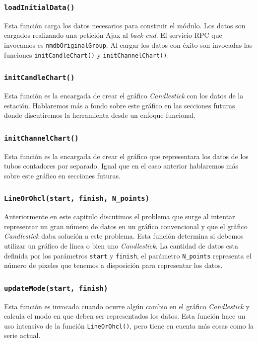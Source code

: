 		\subsubsection{\texttt{loadInitialData()}}
			Esta función carga los datos necesarios para construir el módulo. Los datos son cargados realizando una petición Ajax al
			\emph{back-end}. El servicio RPC que invocamos es \texttt{nmdbOriginalGroup}. Al cargar los datos con éxito son invocadas las
			funciones \texttt{initCandleChart()} y \texttt{initChannelChart()}. 
		\subsubsection{\texttt{initCandleChart()}}
			Esta función es la encargada de crear el gráfico \emph{Candlestick} con los datos de la estación. Hablaremos más a fondo sobre
			este gráfico en las secciones futuras donde discutiremos la herramienta desde un enfoque funcional.
		\subsubsection{\texttt{initChannelChart()}}
			Esta función es la encargada de crear el gráfico que representara los datos de los tubos contadores por separado. Igual que en
			el caso anterior hablaremos más sobre este gráfico en secciones futuras.
		\subsubsection{\texttt{LineOrOhcl(start, finish, N\_points)}}
			Anteriormente en este capitulo discutimos el problema que surge al intentar representar un gran número de datos en un gráfico
			convencional y que el gráfico \emph{Candlestick} daba solución a este problema. Esta función determina si debemos utilizar un
			gráfico de línea o bien uno \emph{Candlestick}. La cantidad de datos esta definida por los parámetros \texttt{start} y
			\texttt{finish}, el parámetro \texttt{N\_points} representa el número de pixeles que tenemos a disposición para representar
			los datos.
		\subsubsection{\texttt{updateMode(start, finish)}}
			Esta función es invocada cuando ocurre algún cambio en el gráfico \emph{Candlestick} y calcula el modo en que deben ser
			representados los datos. Esta función hace un uso intensivo de la función \texttt{LineOrOhcl()}, pero tiene en cuenta más cosas
			como la serie actual.
